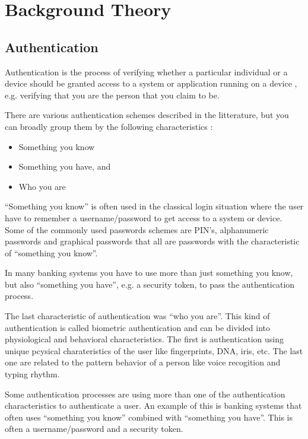 \chapter{Background Theory}

  \section{Authentication}

    Authentication is the process of verifying whether a particular individual or a device should be granted access to a system or application running on a device \cite{IPAS}, e.g. verifying that you are the person that you claim to be.

    There are various authentication schemes described in the litterature, but you can broadly group them by the following characteristics \cite{IPAS}:

      \begin{itemize}
        \item Something you know
        \item Something you have, and
        \item Who you are
      \end{itemize}

    ``Something you know'' is often used in the classical login situation where the user have to remember a username/password to get access to a system or device. Some of the commonly used passwords schemes are PIN's, alphanumeric passwords and graphical passwords that all are passwords with the characteristic of ``something you know''.

    In many banking systems you have to use more than just something you know, but also ``something you have'', e.g. a security token, to pass the authentication process. 

    The last characteristic of authentication was ``who you are''. This kind of authentication is called biometric authentication and can be divided into physiological and behavioral characteristics. The first is authentication using unique pcysical charateristics of the user like fingerprints, DNA, iris, etc. The last one are related to the pattern behavior of a person like voice recogition and typing rhythm. 

    Some authentication processes are using more than one of the authentication characteristics to authenticate a user. An example of this is banking systems that often uses ``something you know'' combined with ``something you have''. This is often a username/password and a security token. 

